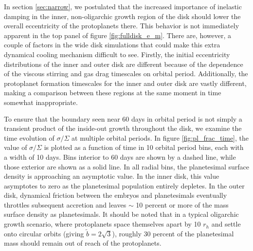 \documentclass[twocolumn]{aastex63}
\begin{document}
In section \ref{sec:narrow}, we postulated that the increased importance of inelastic damping in the inner, non-oligarchic growth region of the disk should lower the overall eccentricity of the protoplanets there. This behavior is not immediately apparent in the top panel of figure \ref{fig:fulldisk_e_m}. There are, however, a couple of factors in the wide disk simulations that could make this extra dynamical cooling mechanism difficult to see. Firstly, the initial eccentricity distributions of the inner and outer disk are different because of the dependence of the viscous stirring and gas drag timescales on orbital period. Additionally, the protoplanet formation timescales for the inner and outer disk are vastly different, making a comparison between these regions at the same moment in time somewhat inappropriate.



To ensure that the boundary seen near 60 days in orbital period is not
simply a transient product of the inside-out growth throughout the
disk, we examine the time evolution of $\sigma/\Sigma$ at multiple
orbital periods. In figure \ref{fig:pl_frac_time}, the value of
$\sigma/\Sigma$ is plotted as a function of time in 10 orbital period
bins, each with a width of 10 days.
Bins interior to 60 days are shown by a dashed line, while those exterior are shown as a solid line. In all radial bins, the planetesimal surface density is approaching an asymptotic value. In the inner disk, this value asymptotes to zero as the planetesimal population entirely depletes. In the outer disk, dynamical friction between the embryos and planetesimals eventually throttles subsequent accretion and leaves $\sim$ 10 percent or more of the mass surface density as planetesimals. It should be noted that in a typical oligarchic growth scenario, where protoplanets space themselves apart by 10 $r_{h}$ and settle onto circular orbits (giving $\tilde{b} = 2 \sqrt{3}$), roughly 30 percent of the planetesimal mass should remain out of reach of the protoplanets.
\end{document}
